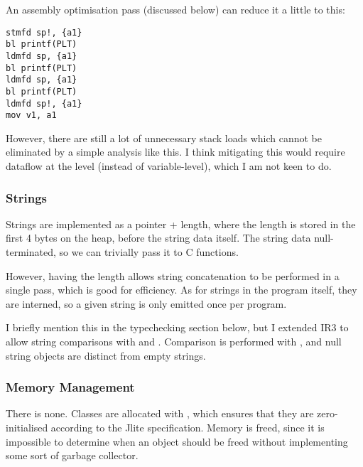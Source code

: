 \documentclass[12pt]{article}
\begin{document}
An assembly optimisation pass (discussed below) can reduce it a little to this:


\begin{verbatim}
stmfd sp!, {a1}
bl printf(PLT)
ldmfd sp, {a1}
bl printf(PLT)
ldmfd sp, {a1}
bl printf(PLT)
ldmfd sp!, {a1}
mov v1, a1
\end{verbatim}

However, there are still a lot of unnecessary stack loads which cannot be eliminated by a simple analysis like this.
I think mitigating this would require dataflow at the  level (instead of variable-level), which
I am not keen to do.








\subsubsection{Strings}

Strings are implemented as a pointer + length, where the length is stored in the first 4 bytes on the heap,
before the string data itself. The string data  null-terminated, so we can trivially pass it to C functions.

However, having the length allows string concatenation to be performed in a single pass, which is good for efficiency.
As for strings in the program itself, they are interned, so a given string is only emitted once per program.

I briefly mention this in the typechecking section below, but I extended IR3 to allow string comparisons with \eqtt{==}
and \eqtt{!=}. Comparison is performed with , and null string objects are distinct from empty strings.




\subsubsection{Memory Management}

There is none. Classes are allocated with , which ensures that they are zero-initialised according to the
Jlite specification. Memory is  freed, since it is impossible to determine when an object should be freed
without implementing some sort of garbage collector.
\end{document}
